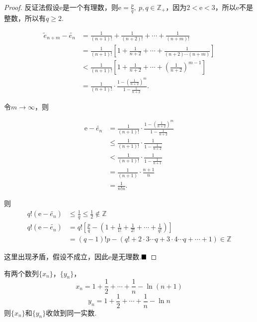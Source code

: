 \begin{proof}
	反证法\qquad 假设e是一个有理数，则$\text{e}=\frac{p}{q},\ p,q\in\mathbb{Z}_+$，因为$2<\text{e}<3$，所以e不是整数，所以有$q\geqslant 2$.
	
	\begin{align*}
		\widetilde{e}_{n+m}-\widetilde{e_n}
		&=\frac{1}{(n+1)!}+\frac{1}{(n+2)!}+\cdots+\frac{1}{(n+m)!}\\
		&=\frac{1}{(n+1)!}\left[1+\frac{1}{n+2}+\cdots+\frac{1}{(n+2)\cdots (n+m)}\right]\\
		&<\frac{1}{(n+1)!}\left[1+\frac{1}{n+2}+\cdots+\left(\frac{1}{n+2}\right)^{m-1}\right]\\
		&=\frac{1}{(n+1)!}\cdot \frac{1-\left(\frac{1}{n+2}\right)^m}{1-\frac{1}{n+2}}.
	\end{align*}
	
	令$m\to\infty$，则
	
	\begin{align*}
		\text{e}-\widetilde{e_n}
		&=\frac{1}{(n+1)!}\cdot \frac{1-\left(\frac{1}{n+2}\right)^m}{1-\frac{1}{n+2}}\\
		&\leqslant\frac{1}{(n+1)!}\cdot \frac{1}{1-\frac{1}{n+2}}\\
		&<\frac{1}{(n+1)!}\cdot \frac{1}{1-\frac{1}{n+1}}\\
		&=\frac{1}{(n+1)}\cdot\frac{n+1}{n}\\
		&=\frac{1}{n!n}.
	\end{align*}
	
	则
	\begin{align}
		q!(\text{e}-\widetilde{e_n})&\leqslant \frac{1}{q}\leqslant\frac{1}{2}\notin \mathbb{Z}\\
		\nonumber
		q!(\text{e}-\widetilde{e_n})
		&=q!\left[\frac{p}{q}-\left(1+\frac{1}{1!}+\frac{1}{2!}+\cdots+\frac{1}{q!}\right)\right]\\
		&=(q-1)!p-(q!+2\cdot3\cdots q+3\cdot4\cdots q+\cdots+1)\in\mathbb{Z}
	\end{align}
	
	这里出现矛盾，假设不成立，因此e是无理数.$\hfill\blacksquare$
\end{proof}
\begin{proposition}
	有两个数列$\{x_n\}$，$\{y_n\}$，
	$$x_n=1+\frac{1}{2}+\cdots+\frac{1}{n}-\ln(n+1)$$
	$$y_n=1+\frac{1}{2}+\cdots+\frac{1}{n}-\ln n$$
	则$\{x_n\}$和$\{y_n\}$收敛到同一实数.
\end{proposition}
